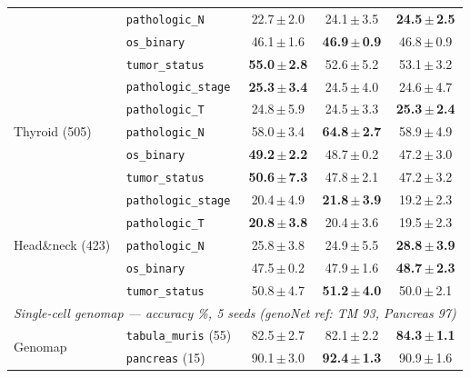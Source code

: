 \documentclass[11pt]{article}
\newcommand{\best}[1]{\textbf{#1}}
\begin{document}
\begin{table}[h]
\begin{tabular}{l l c c c}
 & \texttt{pathologic\_N}     & 22.7\,$\pm$\,2.0 & 24.1\,$\pm$\,3.5 & \best{24.5\,$\pm$\,2.5} \\
 & \texttt{os\_binary}        & 46.1\,$\pm$\,1.6 & \best{46.9\,$\pm$\,0.9} & 46.8\,$\pm$\,0.9 \\
 & \texttt{tumor\_status}     & \best{55.0\,$\pm$\,2.8} & 52.6\,$\pm$\,5.2 & 53.1\,$\pm$\,3.2 \\
\midrule
\multirow{5}{*}{Thyroid (505)}
 & \texttt{pathologic\_stage} & \best{25.3\,$\pm$\,3.4} & 24.5\,$\pm$\,4.0 & 24.6\,$\pm$\,4.7 \\
 & \texttt{pathologic\_T}     & 24.8\,$\pm$\,5.9 & 24.5\,$\pm$\,3.3 & \best{25.3\,$\pm$\,2.4} \\
 & \texttt{pathologic\_N}     & 58.0\,$\pm$\,3.4 & \best{64.8\,$\pm$\,2.7} & 58.9\,$\pm$\,4.9 \\
 & \texttt{os\_binary}        & \best{49.2\,$\pm$\,2.2} & 48.7\,$\pm$\,0.2 & 47.2\,$\pm$\,3.0 \\
 & \texttt{tumor\_status}     & \best{50.6\,$\pm$\,7.3} & 47.8\,$\pm$\,2.1 & 47.2\,$\pm$\,3.2 \\
\midrule
\multirow{5}{*}{Head\&neck (423)}
 & \texttt{pathologic\_stage} & 20.4\,$\pm$\,4.9 & \best{21.8\,$\pm$\,3.9} & 19.2\,$\pm$\,2.3 \\
 & \texttt{pathologic\_T}     & \best{20.8\,$\pm$\,3.8} & 20.4\,$\pm$\,3.6 & 19.5\,$\pm$\,2.3 \\
 & \texttt{pathologic\_N}     & 25.8\,$\pm$\,3.8 & 24.9\,$\pm$\,5.5 & \best{28.8\,$\pm$\,3.9} \\
 & \texttt{os\_binary}        & 47.5\,$\pm$\,0.2 & 47.9\,$\pm$\,1.6 & \best{48.7\,$\pm$\,2.3} \\
 & \texttt{tumor\_status}     & 50.8\,$\pm$\,4.7 & \best{51.2\,$\pm$\,4.0} & 50.0\,$\pm$\,2.1 \\
\midrule
\multicolumn{5}{l}{\emph{Single-cell genomap --- accuracy \%, 5 seeds (genoNet ref: TM 93, Pancreas 97)}}\\
\midrule
\multirow{2}{*}{Genomap}
 & \texttt{tabula\_muris} (55) & 82.5\,$\pm$\,2.7 & 82.1\,$\pm$\,2.2 & \best{84.3\,$\pm$\,1.1} \\
 & \texttt{pancreas} (15)      & 90.1\,$\pm$\,3.0 & \best{92.4\,$\pm$\,1.3} & 90.9\,$\pm$\,1.6 \\
\bottomrule
\end{tabular}
\end{table}
\end{document}
